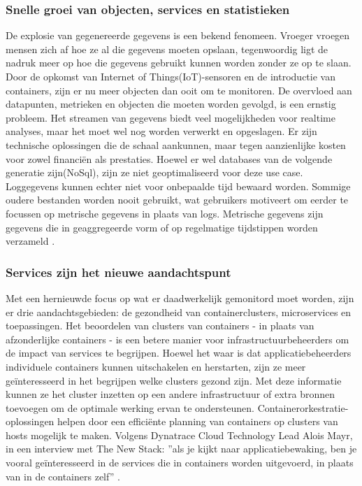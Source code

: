 \subsubsection{Snelle groei van objecten, services en statistieken}

De explosie van gegenereerde gegevens is een bekend fenomeen. Vroeger vroegen mensen zich af hoe ze al die gegevens moeten opslaan, tegenwoordig ligt de nadruk meer op hoe die gegevens gebruikt kunnen worden zonder ze op te slaan. Door de opkomst van Internet of Things(IoT)-sensoren en de introductie van containers, zijn er nu meer objecten dan ooit om te monitoren. De overvloed aan datapunten, metrieken en objecten die moeten worden gevolgd, is een ernstig probleem. Het streamen van gegevens biedt veel mogelijkheden voor realtime analyses, maar het moet wel nog worden verwerkt en opgeslagen. Er zijn technische oplossingen die de schaal aankunnen, maar tegen aanzienlijke kosten voor zowel financiën als prestaties. Hoewel er wel databases van de volgende generatie zijn(NoSql), zijn ze niet geoptimaliseerd voor deze use case. Loggegevens kunnen echter niet voor onbepaalde tijd bewaard worden. Sommige oudere bestanden worden nooit gebruikt, wat gebruikers motiveert om eerder te focussen op metrische gegevens in plaats van logs. Metrische gegevens zijn gegevens die in geaggregeerde vorm of op regelmatige tijdstippen worden verzameld \autocite{Williams2016}.

\subsubsection{Services zijn het nieuwe aandachtspunt}

Met een hernieuwde focus op wat er daadwerkelijk gemonitord moet worden, zijn er drie aandachtsgebieden: de gezondheid van containerclusters, microservices en toepassingen. Het beoordelen van clusters van containers - in plaats van afzonderlijke containers - is een betere manier voor infrastructuurbeheerders om de impact van services te begrijpen. Hoewel het waar is dat applicatiebeheerders individuele containers kunnen uitschakelen en herstarten, zijn ze meer geïnteresseerd in het begrijpen welke clusters gezond zijn. Met deze informatie kunnen ze het cluster inzetten op een andere infrastructuur of extra bronnen toevoegen om de optimale werking ervan te ondersteunen. Containerorkestratie-oplossingen helpen door een efficiënte planning van containers op clusters van hosts mogelijk te maken. Volgens Dynatrace Cloud Technology Lead Alois Mayr, in een interview met The New Stack: ''als je kijkt naar applicatiebewaking, ben je vooral geïnteresseerd in de services die in containers worden uitgevoerd, in plaats van in de containers zelf'' \autocite{Williams2016}.
\clearpage
